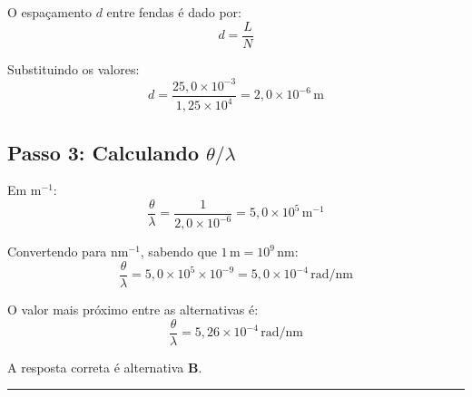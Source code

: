 \documentclass[a4paper,12pt]{article}
\begin{document}
\begin{flushleft}
O espaçamento \(d\) entre fendas é dado por:
\[
d = \frac{L}{N}
\]

Substituindo os valores:
\[
d = \frac{25,0 \times 10^{-3}}{1,25 \times 10^4} = 2,0 \times 10^{-6}\,\mathrm{m}
\]

\subsection*{Passo 3: Calculando \( \theta/\lambda \)}

Em \(\mathrm{m}^{-1}\):
\[
\frac{\theta}{\lambda} = \frac{1}{2,0 \times 10^{-6}} = 5,0 \times 10^{5}\,\mathrm{m}^{-1}
\]

Convertendo para \(\mathrm{nm}^{-1}\), sabendo que \(1\,\mathrm{m} = 10^{9}\,\mathrm{nm}\):
\[
\frac{\theta}{\lambda} = 5,0 \times 10^{5} \times 10^{-9} = 5,0 \times 10^{-4}\,\mathrm{rad/nm}
\]

O valor mais próximo entre as alternativas é:
\[
\boxed{\frac{\theta}{\lambda} = 5,26 \times 10^{-4}\,\mathrm{rad/nm}}
\]


A resposta correta é alternativa \colorbox{green!50}{\textbf{B}}.
\end{flushleft}

\noindent\rule{\linewidth}{0.6pt}\\
\end{document}
